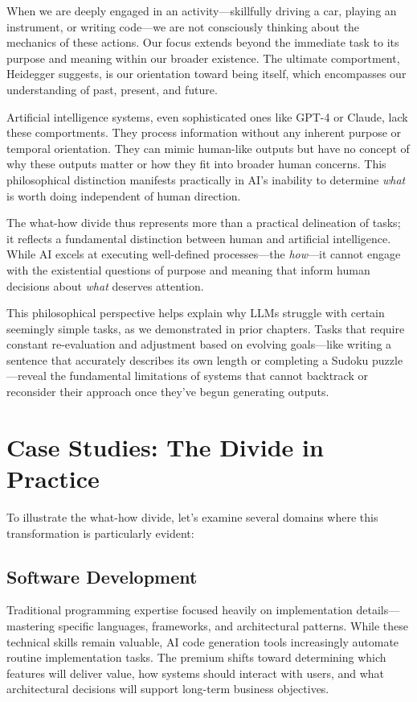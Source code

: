 \documentclass[
  Letterpaper,
]{scrbook}
\begin{document}
When we are deeply engaged in an activity---skillfully driving a car,
playing an instrument, or writing code---we are not consciously thinking
about the mechanics of these actions. Our focus extends beyond the
immediate task to its purpose and meaning within our broader existence.
The ultimate comportment, Heidegger suggests, is our orientation toward
being itself, which encompasses our understanding of past, present, and
future.

Artificial intelligence systems, even sophisticated ones like GPT-4 or
Claude, lack these comportments. They process information without any
inherent purpose or temporal orientation. They can mimic human-like
outputs but have no concept of why these outputs matter or how they fit
into broader human concerns. This philosophical distinction manifests
practically in AI's inability to determine \emph{what} is worth doing
independent of human direction.

The what-how divide thus represents more than a practical delineation of
tasks; it reflects a fundamental distinction between human and
artificial intelligence. While AI excels at executing well-defined
processes---the \emph{how}---it cannot engage with the existential
questions of purpose and meaning that inform human decisions about
\emph{what} deserves attention.

This philosophical perspective helps explain why LLMs struggle with
certain seemingly simple tasks, as we demonstrated in prior chapters.
Tasks that require constant re-evaluation and adjustment based on
evolving goals---like writing a sentence that accurately describes its
own length or completing a Sudoku puzzle---reveal the fundamental
limitations of systems that cannot backtrack or reconsider their
approach once they've begun generating outputs.

\section{Case Studies: The Divide in
Practice}\label{case-studies-the-divide-in-practice}

To illustrate the what-how divide, let's examine several domains where
this transformation is particularly evident:

\subsection{Software Development}\label{software-development}

Traditional programming expertise focused heavily on implementation
details---mastering specific languages, frameworks, and architectural
patterns. While these technical skills remain valuable, AI code
generation tools increasingly automate routine implementation tasks. The
premium shifts toward determining which features will deliver value, how
systems should interact with users, and what architectural decisions
will support long-term business objectives.
\end{document}
